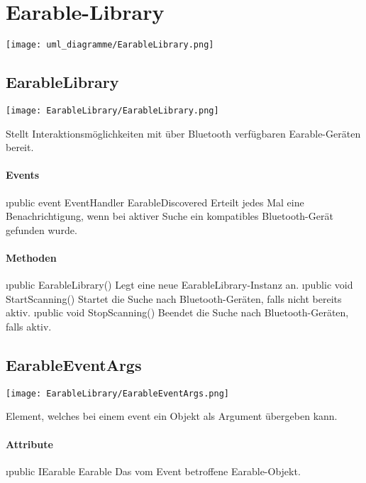 \documentclass[../entwurf.tex]{subfiles}
\begin{document}
\section{Earable-Library}

\texttt{[image: uml\_diagramme/EarableLibrary.png]}

\subsection{EarableLibrary}
\begin{center}
	\texttt{[image: EarableLibrary/EarableLibrary.png]}
\end{center}
Stellt Interaktionsmöglichkeiten mit über Bluetooth verfügbaren Earable-Geräten bereit.
\paragraph{Events}
\begin{itemize}
	\i{public event EventHandler EarableDiscovered} Erteilt jedes Mal eine Benachrichtigung, wenn bei aktiver Suche ein kompatibles Bluetooth-Gerät gefunden wurde.
\end{itemize}
\paragraph{Methoden}
\begin{itemize}
	\i{public EarableLibrary()} Legt eine neue EarableLibrary-Instanz an.
	\i{public void StartScanning()} Startet die Suche nach Bluetooth-Geräten, falls nicht bereits aktiv.
	\i{public void StopScanning()} Beendet die Suche nach Bluetooth-Geräten, falls aktiv.
\end{itemize}

\subsection{EarableEventArgs}
\begin{center}
	\texttt{[image: EarableLibrary/EarableEventArgs.png]}
\end{center}
Element, welches bei einem \Gls{event} ein  Objekt als Argument übergeben kann.
\paragraph{Attribute}
\begin{itemize}
	\i{public IEarable Earable} Das vom Event betroffene Earable-Objekt.
\end{itemize}
\end{document}
